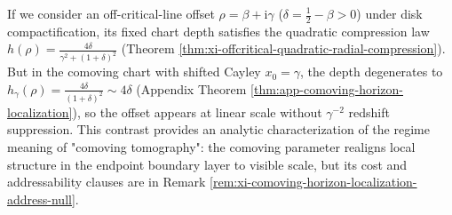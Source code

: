 \begin{remark}\label{rem:xi-horizon-comoving-vs-redshift}
If we consider an off-critical-line offset \(\rho=\beta+\mathrm{i}\gamma\) (\(\delta=\tfrac12-\beta>0\)) under disk compactification, its fixed chart depth satisfies the quadratic compression law
\(
h(\rho)=\frac{4\delta}{\gamma^2+(1+\delta)^2}
\)
(Theorem \ref{thm:xi-offcritical-quadratic-radial-compression}).
But in the comoving chart with shifted Cayley \(x_0=\gamma\), the depth degenerates to
\(
h_{\gamma}(\rho)=\frac{4\delta}{(1+\delta)^2}\sim 4\delta
\)
(Appendix Theorem \ref{thm:app-comoving-horizon-localization}), so the offset appears at linear scale without \(\gamma^{-2}\) redshift suppression.
This contrast provides an analytic characterization of the regime meaning of "comoving tomography": the comoving parameter realigns local structure in the endpoint boundary layer to visible scale, but its cost and addressability clauses are in Remark \ref{rem:xi-comoving-horizon-localization-address-null}.
\end{remark}

